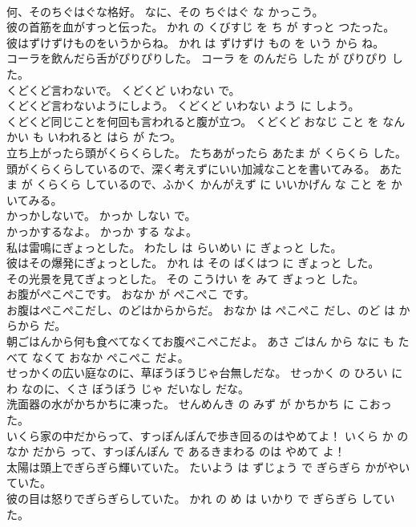 \documentclass[8pt]{extreport}
\begin{document}
\begin{CJK}{UTF8}{min}
\\	何、そのちぐはぐな格好。	なに、その ちぐはぐ な かっこう。	
\\	彼の首筋を血がすっと伝った。	かれ の くびすじ を ち が すっと つたった。	
\\	彼はずけずけものをいうからね。	かれ は ずけずけ もの を いう から ね。	
\\	コーラを飲んだら舌がぴりぴりした。	コーラ を のんだら した が ぴりぴり した。	
\\	くどくど言わないで。	くどくど いわない で。	
\\	くどくど言わないようにしよう。	くどくど いわない よう に しよう。	
\\	くどくど同じことを何回も言われると腹が立つ。	くどくど おなじ こと を なんかい も いわれると はら が たつ。	
\\	立ち上がったら頭がくらくらした。	たちあがったら あたま が くらくら した。	
\\	頭がくらくらしているので、深く考えずにいい加減なことを書いてみる。	あたま が くらくら しているので、ふかく かんがえず に いいかげん な こと を かいてみる。	
\\	かっかしないで。	かっか しない で。	
\\	かっかするなよ。	かっか する なよ。	
\\	私は雷鳴にぎょっとした。	わたし は らいめい に ぎょっと した。	
\\	彼はその爆発にぎょっとした。	かれ は その ばくはつ に ぎょっと した。	
\\	その光景を見てぎょっとした。	その こうけい を みて ぎょっと した。	
\\	お腹がぺこぺこです。	おなか が ぺこぺこ です。	
\\	お腹はぺこぺこだし、のどはからからだ。	おなか は ぺこぺこ だし、のど は からから だ。	
\\	朝ごはんから何も食べてなくてお腹ぺこぺこだよ。	あさ ごはん から なに も たべて なくて おなか ぺこぺこ だよ。	
\\	せっかくの広い庭なのに、草ぼうぼうじゃ台無しだな。	せっかく の ひろい にわ なのに、くさ ぼうぼう じゃ だいなし だな。	
\\	洗面器の水がかちかちに凍った。	せんめんき の みず が かちかち に こおった。	
\\	いくら家の中だからって、すっぽんぽんで歩き回るのはやめてよ！	いくら か の なか だから って、すっぽんぽん で あるきまわる のは やめて よ！	
\\	太陽は頭上でぎらぎら輝いていた。	たいよう は ずじょう で ぎらぎら かがやいていた。	
\\	彼の目は怒りでぎらぎらしていた。	かれ の め は いかり で ぎらぎら していた。	

\end{CJK}
\end{document}
